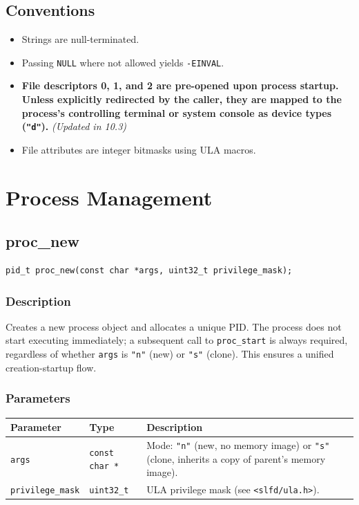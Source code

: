 \documentclass[12pt,a4paper]{article}
\begin{document}
\subsection{Conventions}
\begin{itemize}
    \item Strings are null-terminated.
    \item Passing \texttt{NULL} where not allowed yields \texttt{-EINVAL}.
    \item \textbf{File descriptors 0, 1, and 2 are pre-opened upon process startup. Unless explicitly redirected by the caller, they are mapped to the process's controlling terminal or system console as device types (\texttt{"d"}).} \textit{(Updated in 10.3)}
    \item File attributes are integer bitmasks using ULA macros.
\end{itemize}
\section{Process Management}

\subsection{proc\_new}
\begin{lstlisting}
pid_t proc_new(const char *args, uint32_t privilege_mask);
\end{lstlisting}

\subsubsection{Description}
Creates a new process object and allocates a unique PID. The process does not start executing immediately; a subsequent call to \texttt{proc\_start} is always required, regardless of whether \texttt{args} is \texttt{"n"} (new) or \texttt{"s"} (clone). This ensures a unified creation-startup flow.

\subsubsection{Parameters}
\begin{tabularx}{\textwidth}{|l|l|X|}
\hline
\textbf{Parameter} & \textbf{Type} & \textbf{Description} \\
\hline
\verb|args| & \verb|const char *| & Mode: \texttt{"n"} (new, no memory image) or \texttt{"s"} (clone, inherits a copy of parent's memory image). \\
\verb|privilege_mask| & \verb|uint32_t| & ULA privilege mask (see \texttt{<slfd/ula.h>}). \\
\hline
\end{tabularx}
\end{document}
